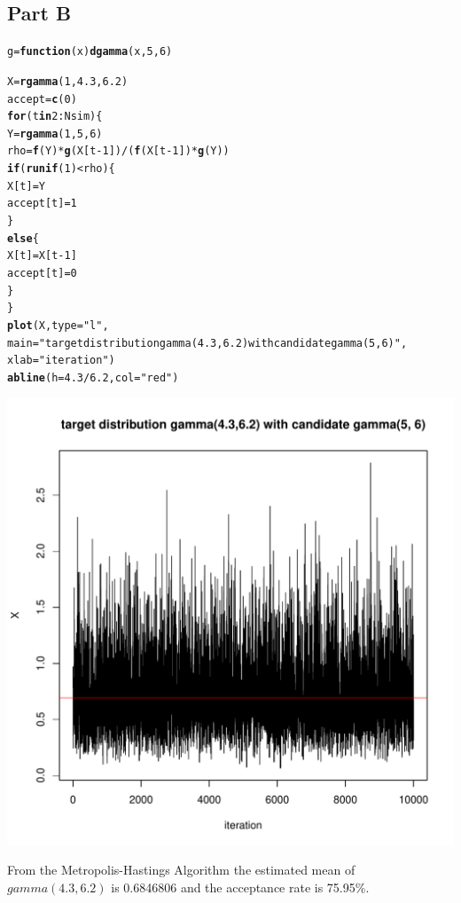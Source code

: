 \documentclass{article}\usepackage[]{graphicx}\usepackage[]{color}
\makeatletter
\newcommand{\hlnum}[1]{\textcolor[rgb]{0.686,0.059,0.569}{#1}}%
\newcommand{\hlstr}[1]{\textcolor[rgb]{0.192,0.494,0.8}{#1}}%
\newcommand{\hlopt}[1]{\textcolor[rgb]{0,0,0}{#1}}%
\newcommand{\hlstd}[1]{\textcolor[rgb]{0.345,0.345,0.345}{#1}}%
\newcommand{\hlkwa}[1]{\textcolor[rgb]{0.161,0.373,0.58}{\textbf{#1}}}%
\newcommand{\hlkwb}[1]{\textcolor[rgb]{0.69,0.353,0.396}{#1}}%
\newcommand{\hlkwc}[1]{\textcolor[rgb]{0.333,0.667,0.333}{#1}}%
\newcommand{\hlkwd}[1]{\textcolor[rgb]{0.737,0.353,0.396}{\textbf{#1}}}%
\newenvironment{kframe}{%
 \def\at@end@of@kframe{}%
 \ifinner\ifhmode%
  \def\at@end@of@kframe{\end{minipage}}%
  \begin{minipage}{\columnwidth}%
 \fi\fi%
 \def\FrameCommand##1{\hskip\@totalleftmargin \hskip-\fboxsep
 \colorbox{shadecolor}{##1}\hskip-\fboxsep
     \hskip-\linewidth \hskip-\@totalleftmargin \hskip\columnwidth}%
 \MakeFramed {\advance\hsize-\width
   \@totalleftmargin\z@ \linewidth\hsize
   \@setminipage}}%
 {\par\unskip\endMakeFramed%
 \at@end@of@kframe}
\newenvironment{knitrout}{}{} %
\makeatother
\begin{document}
\subsection*{Part B}
\begin{knitrout}
\color{fgcolor}\begin{kframe}
\begin{alltt}
\hlstd{g} \hlkwb{=} \hlkwa{function}\hlstd{(}\hlkwc{x}\hlstd{)} \hlkwd{dgamma}\hlstd{(x,}\hlnum{5}\hlstd{,}\hlnum{6}\hlstd{)}

\hlstd{X}\hlkwb{=}\hlkwd{rgamma}\hlstd{(}\hlnum{1}\hlstd{,} \hlnum{4.3}\hlstd{,}\hlnum{6.2}\hlstd{)}
\hlstd{accept} \hlkwb{=} \hlkwd{c}\hlstd{(}\hlnum{0}\hlstd{)}
\hlkwa{for} \hlstd{(t} \hlkwa{in} \hlnum{2}\hlopt{:}\hlstd{Nsim)\{}
  \hlstd{Y}\hlkwb{=}\hlkwd{rgamma}\hlstd{(}\hlnum{1}\hlstd{,} \hlnum{5}\hlstd{,}\hlnum{6}\hlstd{)}
  \hlstd{rho}\hlkwb{=}\hlkwd{f}\hlstd{(Y)}\hlopt{*}\hlkwd{g}\hlstd{(X[t}\hlopt{-}\hlnum{1}\hlstd{])}\hlopt{/}\hlstd{(}\hlkwd{f}\hlstd{(X[t}\hlopt{-}\hlnum{1}\hlstd{])}\hlopt{*}\hlkwd{g}\hlstd{(Y))}
  \hlkwa{if}\hlstd{(}\hlkwd{runif}\hlstd{(}\hlnum{1}\hlstd{)}\hlopt{<}\hlstd{rho)\{}
    \hlstd{X[t]} \hlkwb{=} \hlstd{Y}
    \hlstd{accept[t]} \hlkwb{=} \hlnum{1}
  \hlstd{\}}
  \hlkwa{else}\hlstd{\{}
    \hlstd{X[t]} \hlkwb{=}\hlstd{X[t}\hlopt{-}\hlnum{1}\hlstd{]}
    \hlstd{accept[t]} \hlkwb{=} \hlnum{0}
  \hlstd{\}}
\hlstd{\}}
\hlkwd{plot}\hlstd{(X,} \hlkwc{type} \hlstd{=} \hlstr{"l"}\hlstd{,}
     \hlkwc{main} \hlstd{=} \hlstr{"target distribution gamma(4.3,6.2) with candidate gamma(5, 6)"}\hlstd{,}
     \hlkwc{xlab} \hlstd{=} \hlstr{"iteration"}\hlstd{)}
\hlkwd{abline}\hlstd{(}\hlkwc{h} \hlstd{=} \hlnum{4.3}\hlopt{/}\hlnum{6.2}\hlstd{,} \hlkwc{col} \hlstd{=} \hlstr{"red"}\hlstd{)}
\end{alltt}
\end{kframe}
\includegraphics[width=0.60\linewidth]{figure/unnamed-chunk-3-1} 

\end{knitrout}
From the Metropolis-Hastings Algorithm the estimated mean of $gamma(4.3,6.2)$ is 0.6846806 and the acceptance rate is 75.95\%.
\end{document}
